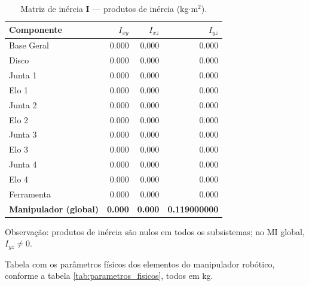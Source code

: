 \begin{table}[h]
\centering
\small
\caption{Matriz de inércia $\mathbf{I}$ — produtos de inércia (kg$\cdot$m$^{2}$).}
\label{tab:mi_produtos}
\begin{tabular}{lrrr}
\hline
Componente & $I_{xy}$ & $I_{xz}$ & $I_{yz}$ \\
\hline
Base Geral         & 0.000 & 0.000 & 0.000 \\
Disco              & 0.000 & 0.000 & 0.000 \\
Junta 1            & 0.000 & 0.000 & 0.000 \\
Elo 1              & 0.000 & 0.000 & 0.000 \\
Junta 2            & 0.000 & 0.000 & 0.000 \\
Elo 2              & 0.000 & 0.000 & 0.000 \\
Junta 3            & 0.000 & 0.000 & 0.000 \\
Elo 3              & 0.000 & 0.000 & 0.000 \\
Junta 4            & 0.000 & 0.000 & 0.000 \\
Elo 4              & 0.000 & 0.000 & 0.000 \\
Ferramenta         & 0.000 & 0.000 & 0.000 \\
\hline
\textbf{Manipulador (global)} & \textbf{0.000} & \textbf{0.000} & \textbf{0.119000000} \\
\hline
\end{tabular}

\vspace{0.2em}
\footnotesize{Observação: produtos de inércia são nulos em todos os subsistemas; no MI global, $I_{yz}\neq 0$.}
\end{table}


\newpage

Tabela com os parâmetros físicos dos elementos do manipulador robótico, conforme a tabela \ref{tab:parametros_fisicos}, todos em kg.

